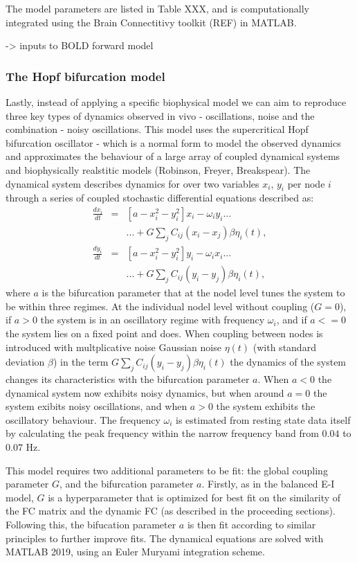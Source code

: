 \documentclass[oneside]{zHenriquesLab-StyleBioRxiv}
\begin{document}
The model parameters are listed in Table XXX, and is computationally integrated using the Brain Connectitivy toolkit (REF) in MATLAB.


-> inputs to BOLD forward model

\subsubsection*{The Hopf bifurcation model} 
Lastly, instead of applying a specific biophysical model we can aim to reproduce three key types of dynamics observed in vivo - oscillations, noise and the combination - noisy oscillations. This model uses the supercritical Hopf bifurcation oscillator - which is a normal form to model the observed dynamics and approximates the behaviour of a large array of coupled dynamical systems and biophysically realstitic models (Robinson, Freyer, Breakspear). The dynamical system describes dynamics for over two variables $x_i$, $y_i$ per node $i$ through a series of coupled stochastic differential equations described as:
\begin{eqnarray}
\frac{dx_i}{dt} &=& [a - x_i^2 - y_i^2]x_i- \omega_iy_i...\\
& &...+ G\sum_jC_{ij}(x_i-x_j)\beta\eta_i(t),\\
\frac{dy_i}{dt} &=& [a - x_i^2 - y_i^2]y_i - \omega_ix_i ... \\
& &...+ G\sum_jC_{ij}(y_i-y_j)\beta\eta_i(t),
\end{eqnarray}
where $a$ is the bifurcation parameter that at the nodel level tunes the system to be within three regimes. At the individual nodel level without coupling ($G=0$), if $a>0$ the system is in an oscillatory regime with frequency $\omega_i$, and if $a<=0$ the system lies on a fixed point and does. When coupling between nodes is introduced with multplicative noise Gaussian noise $\eta(t)$ (with standard deviation $\beta$) in the term $G\sum_jC_{ij}(y_i-y_j)\beta\eta_i(t)$ the dynamics of the system changes its characteristics with the bifurcation parameter $a$. When $a<0$ the dynamical system now exhibits noisy dynamics, but when around $a=0$ the system exibits noisy oscillations, and when $a>0$ the system exhibits the oscillatory behaviour. The frequency $\omega_i$ is estimated from resting state data itself by calculating the peak frequency within the narrow frequency band from $0.04$ to $0.07$ Hz. 

This model requires two additional parameters to be fit: the global coupling parameter $G$, and the bifurcation parameter $a$. Firstly, as in the balanced E-I model, $G$ is a hyperparameter that is optimized for best fit on the similarity of the FC matrix and the dynamic FC (as described in the proceeding sections). Following this, the bifucation parameter $a$ is then fit according to similar principles to further improve fits. The dynamical equations are solved with MATLAB 2019, using an Euler Muryami integration scheme. 
\end{document}
